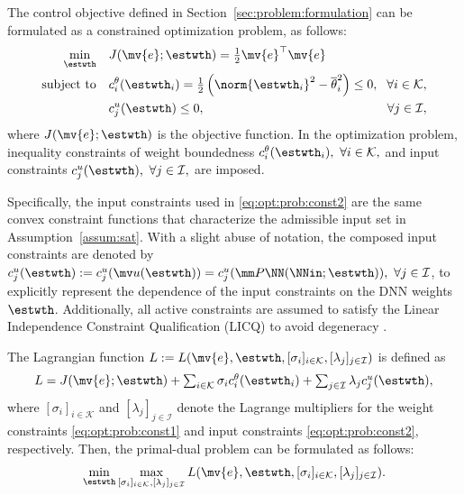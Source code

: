 \documentclass[letterpaper, journal]{IEEEtran}
\begin{document}
The control objective defined in Section~\ref{sec:problem:formulation} can be formulated as a constrained optimization problem, as follows:
\begin{subequations} \label{eq:opt:prob} 
  \begin{align} 
    \min_{\estwth} \quad 
    & 
    J(\mv{e};\estwth)
    = 
    \tfrac{1}{2} \mv{e}^\top \mv{e} 
    &
    \label{eq:opt:prob:obj} 
    \\ 
    \text{subject to} \quad  
    & 
    c^{\theta}_i(\estwth_i)=\tfrac{1}{2}
    \left(
      \norm{\estwth_i}^2
      -
      \overline{\theta}_i^2 
    \right)
    \le 0, 
    \!
    &
    \!
    \forall i\in\mathcal{K} 
    ,
    \label{eq:opt:prob:const1} 
    \\ 
    & 
    c^{u}_j(\estwth)
    \le 0, 
    &
    \forall j\in\mathcal{I} 
    \label{eq:opt:prob:const2} 
    ,
  \end{align}%
\end{subequations}
where $J(\mv{e};\estwth)$ is the objective function.
In the optimization problem, inequality constraints of weight boundedness $c^{\theta}_i(\estwth_i),\ \forall i\in\mathcal{K},$ and input constraints $c^{u}_j(\estwth),\ \forall j\in\mathcal{I},$ are imposed.

Specifically, the input constraints used in \eqref{eq:opt:prob:const2} are the same convex constraint functions that characterize the admissible input set in Assumption~\ref{assum:sat}.
With a slight abuse of notation, the composed input constraints are denoted by
$c_j^u(\estwth):=c_j^u(\mv u(\estwth))=c_j^u(\mm P\NN(\NNin;\estwth)),\ \forall j\in\mathcal I$, to explicitly represent the dependence of the input constraints on the DNN weights $\estwth$.
Additionally, all active constraints are assumed to satisfy the Linear Independence Constraint Qualification (LICQ) to avoid degeneracy \cite[pp. 465--467]{Nocedal:2006aa}.

The Lagrangian function $L:=L(\mv{e},\estwth,[\sigma_i]_{i\in\mathcal{K}},[\lambda_j]_{j\in\mathcal I})$ is defined as
\begin{equation}
  L
  = 
  J(\mv{e};\estwth) 
  + 
  \textstyle\sum_{i\in\mathcal{K}}
  \sigma_{i}
  c^{\theta}_{i}(\estwth_i)
  +
  \textstyle\sum_{j\in\mathcal I}
  \lambda_{j}
  c^{u}_{j}(\estwth)
  ,
  \label{eq:lagrangian}
\end{equation}
where $[\sigma_i]_{i\in\mathcal{K}}$ and $[\lambda_j]_{j\in\mathcal{I}}$ denote the Lagrange multipliers for the weight constraints \eqref{eq:opt:prob:const1} and input constraints \eqref{eq:opt:prob:const2}, respectively.
Then, the primal-dual problem can be formulated as follows:
\begin{equation} \label{eq:opt:prob:saddle}
  \min_{\estwth}
  \max_{
    [\sigma_i]_{i\in\mathcal{K}}
    ,
    [\lambda_j]_{j\in\mathcal{I}}
  } 
  L(\mv{e},\estwth,[\sigma_i]_{i\in\mathcal{K}},[\lambda_j]_{j\in\mathcal I})
  .
\end{equation}
\end{document}
